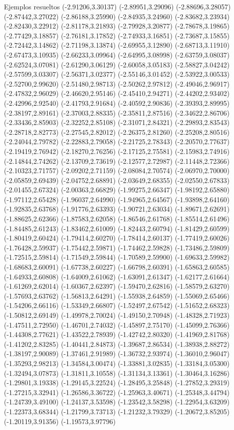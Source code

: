 \documentclass[11pt,a4paper]{article}
\begin{document}
\begin{fmex}{Ejemplos resueltos}
(-2.91206,3.30137) (-2.89951,3.29096) (-2.88696,3.28057) (-2.87442,3.27022) (-2.86188,3.25990) (-2.84935,3.24960) (-2.83682,3.23934) (-2.82430,3.22912) (-2.81178,3.21893) (-2.79928,3.20877) (-2.78678,3.19865) (-2.77429,3.18857) (-2.76181,3.17852) (-2.74933,3.16851) (-2.73687,3.15855) (-2.72442,3.14862) (-2.71198,3.13874) (-2.69955,3.12890) (-2.68713,3.11910) (-2.67473,3.10935) (-2.66233,3.09964) (-2.64995,3.08998) (-2.63759,3.08037) (-2.62524,3.07081) (-2.61290,3.06129) (-2.60058,3.05183) (-2.58827,3.04242) (-2.57599,3.03307) (-2.56371,3.02377) (-2.55146,3.01452) (-2.53922,3.00533) (-2.52700,2.99620) (-2.51480,2.98713) (-2.50262,2.97812) (-2.49046,2.96917) (-2.47832,2.96029) (-2.46620,2.95146) (-2.45410,2.94271) (-2.44202,2.93402) (-2.42996,2.92540) (-2.41793,2.91684) (-2.40592,2.90836) (-2.39393,2.89995) (-2.38197,2.89161) (-2.37003,2.88335) (-2.35811,2.87516) (-2.34622,2.86706) (-2.33436,2.85903) (-2.32252,2.85108) (-2.31071,2.84321) (-2.29893,2.83543) (-2.28718,2.82773) (-2.27545,2.82012) (-2.26375,2.81260) (-2.25208,2.80516) (-2.24044,2.79782) (-2.22883,2.79058) (-2.21725,2.78343) (-2.20570,2.77637) (-2.19419,2.76942) (-2.18270,2.76256) (-2.17125,2.75581) (-2.15983,2.74916) (-2.14844,2.74262) (-2.13709,2.73619) (-2.12577,2.72987) (-2.11448,2.72366) (-2.10323,2.71757) (-2.09202,2.71159) (-2.08084,2.70574) (-2.06970,2.70000) (-2.05859,2.69439) (-2.04752,2.68891) (-2.03649,2.68355) (-2.02550,2.67833) (-2.01455,2.67324) (-2.00363,2.66829) (-1.99275,2.66347) (-1.98192,2.65880) (-1.97112,2.65428) (-1.96037,2.64990) (-1.94965,2.64567) (-1.93898,2.64160) (-1.92835,2.63768) (-1.91776,2.63393) (-1.90721,2.63034) (-1.89671,2.62691) (-1.88625,2.62366) (-1.87583,2.62058) (-1.86546,2.61768) (-1.85514,2.61496) (-1.84485,2.61243) (-1.83462,2.61009) (-1.82443,2.60794) (-1.81429,2.60599) (-1.80419,2.60424) (-1.79414,2.60270) (-1.78414,2.60137) (-1.77419,2.60026) (-1.76428,2.59937) (-1.75442,2.59871) (-1.74462,2.59828) (-1.73486,2.59809) (-1.72515,2.59814) (-1.71549,2.59844) (-1.70589,2.59900) (-1.69633,2.59982) (-1.68683,2.60091) (-1.67738,2.60227) (-1.66798,2.60391) (-1.65863,2.60585) (-1.64933,2.60808) (-1.64009,2.61062) (-1.63091,2.61347) (-1.62177,2.61664) (-1.61269,2.62014) (-1.60367,2.62397) (-1.59470,2.62816) (-1.58579,2.63270) (-1.57693,2.63762) (-1.56813,2.64291) (-1.55938,2.64859) (-1.55069,2.65466) (-1.54206,2.66116) (-1.53349,2.66807) (-1.52497,2.67542) (-1.51652,2.68323) (-1.50812,2.69149) (-1.49978,2.70024) (-1.49150,2.70948) (-1.48328,2.71923) (-1.47511,2.72950) (-1.46701,2.74032) (-1.45897,2.75170) (-1.45099,2.76366) (-1.44308,2.77621) (-1.43522,2.78939) (-1.42742,2.80320) (-1.41969,2.81768) (-1.41202,2.83285) (-1.40441,2.84873) (-1.39687,2.86534) (-1.38938,2.88272) (-1.38197,2.90089) (-1.37461,2.91989) (-1.36732,2.93974) (-1.36010,2.96047) (-1.35293,2.98213) (-1.34584,3.00474) (-1.33881,3.02835) (-1.33184,3.05300) (-1.32494,3.07873) (-1.31811,3.10558) (-1.31134,3.13361) (-1.30464,3.16286) (-1.29801,3.19338) (-1.29145,3.22524) (-1.28495,3.25848) (-1.27852,3.29319) (-1.27215,3.32941) (-1.26586,3.36722) (-1.25963,3.40671) (-1.25348,3.44794) (-1.24739,3.49100) (-1.24137,3.53598) (-1.23542,3.58298) (-1.22954,3.63209) (-1.22373,3.68344) (-1.21799,3.73713) (-1.21232,3.79329) (-1.20672,3.85205) (-1.20119,3.91356) (-1.19573,3.97796) 
\end{fmex}
\end{document}
